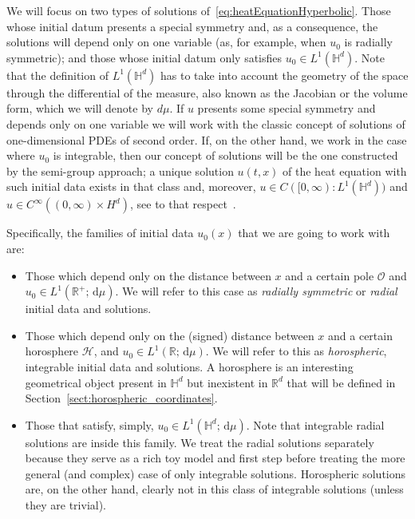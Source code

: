 \documentclass[12pt,longbibliography]{article}
\def\R{\mathbb{R}}
\def\d{\,\mathrm{d}}
\def\R{\mathbb{R}}
\def\d{\,\mathrm{d}}
\def\H{\mathbb{H}}
\theoremstyle{definition}
\theoremstyle{remark}
\theoremstyle{example}
\begin{document}
We will focus on two types of solutions of~\eqref{eq:heatEquationHyperbolic}. Those whose initial datum presents a special symmetry and, as a consequence, the solutions will depend only on one variable (as, for example, when $u_0$ is radially symmetric); and those whose initial datum only satisfies $u_0\in L^1(\H^d)$. Note that the definition of $L^1(\H^d)$ has to take into account the geometry of the space through the differential of the measure, also known as the Jacobian or the volume form, which we will denote by $d\mu$. If $u$ presents some special symmetry and depends only on one variable we will work with the classic concept of solutions of one-dimensional PDEs of second order. If, on the other hand, we work in the case where $u_0$ is integrable, then our concept of solutions will be the one constructed by the semi-group approach; a unique solution $u(t,x)$ of the heat equation with such initial data exists in that class and, moreover, $u\in C([0,\infty) : L^1(\H^d))$ and $u\in C^\infty((0,\infty)\times H^d)$, see to that respect~\cite{Grigor'yan,Strichartz}.

Specifically, the families of initial data $u_0(x)$ that we are going to work with are:
\begin{itemize}
	\item[-] Those which depend only on the distance between $x$ and a certain pole $\mathcal{O}$ and $u_0\in L^1(\R^+; \d\mu)$. We will refer to this case as \textit{radially symmetric} or \textit{radial} initial data and solutions.
	
	
	\item[-] Those which depend only on the (signed) distance between $x$ and a certain horosphere $\mathcal{H}$, and $u_0\in L^1(\R; \d\mu)$. We will refer to this as \textit{horospheric}, integrable initial data and solutions. A horosphere is an interesting geometrical object present in $\H^d$ but inexistent in $\R^d$ that will be defined in Section~\ref{sect:horospheric_coordinates}.
	
	\item[-] Those that satisfy, simply, $u_0\in L^1(\H^d; \d\mu)$. Note that integrable radial solutions are inside this family. We treat the radial solutions separately because they serve as a rich toy model and first step before treating the more general (and complex) case of only integrable solutions. Horospheric solutions are, on the other hand, clearly not in this class of integrable solutions (unless they are trivial).
\end{itemize}
\end{document}
